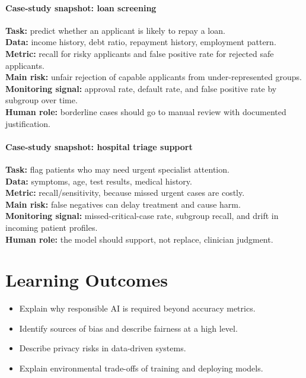 \documentclass[11pt]{article}
\begin{document}
\paragraph{Case-study snapshot: loan screening}
\textbf{Task:} predict whether an applicant is likely to repay a loan.\\
\textbf{Data:} income history, debt ratio, repayment history, employment pattern.\\
\textbf{Metric:} recall for risky applicants and false positive rate for rejected safe applicants.\\
\textbf{Main risk:} unfair rejection of capable applicants from under-represented groups.\\
\textbf{Monitoring signal:} approval rate, default rate, and false positive rate by subgroup over time.\\
\textbf{Human role:} borderline cases should go to manual review with documented justification.

\paragraph{Case-study snapshot: hospital triage support}
\textbf{Task:} flag patients who may need urgent specialist attention.\\
\textbf{Data:} symptoms, age, test results, medical history.\\
\textbf{Metric:} recall/sensitivity, because missed urgent cases are costly.\\
\textbf{Main risk:} false negatives can delay treatment and cause harm.\\
\textbf{Monitoring signal:} missed-critical-case rate, subgroup recall, and drift in incoming patient profiles.\\
\textbf{Human role:} the model should support, not replace, clinician judgment.

\section{Learning Outcomes}
\begin{itemize}[leftmargin=*]
  \item Explain why responsible AI is required beyond accuracy metrics.
  \item Identify sources of bias and describe fairness at a high level.
  \item Describe privacy risks in data-driven systems.
  \item Explain environmental trade-offs of training and deploying models.
\end{itemize}
\end{document}
